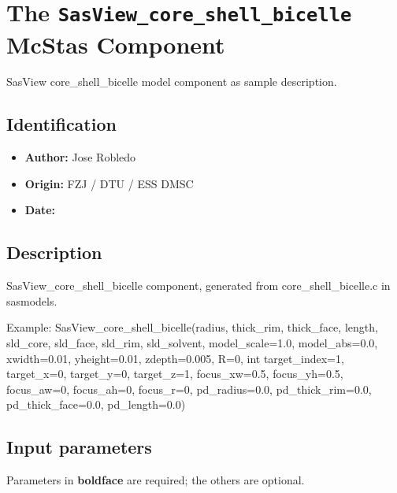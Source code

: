 \section{The \texttt{SasView\_core\_shell\_bicelle} McStas Component}
SasView core\_shell\_bicelle model component as sample description.

\subsection*{Identification}
\begin{itemize}
  \item \textbf{Author:} Jose Robledo
  \item \textbf{Origin:} FZJ / DTU / ESS DMSC
  \item \textbf{Date:} 
\end{itemize}

\subsection*{Description}
SasView\_core\_shell\_bicelle component, generated from core\_shell\_bicelle.c in sasmodels.

Example: SasView\_core\_shell\_bicelle(radius, thick\_rim, thick\_face, length, sld\_core, sld\_face, sld\_rim, sld\_solvent, model\_scale=1.0, model\_abs=0.0, xwidth=0.01, yheight=0.01, zdepth=0.005, R=0, int target\_index=1, target\_x=0, target\_y=0, target\_z=1, focus\_xw=0.5, focus\_yh=0.5, focus\_aw=0, focus\_ah=0, focus\_r=0, pd\_radius=0.0, pd\_thick\_rim=0.0, pd\_thick\_face=0.0, pd\_length=0.0)

\subsection*{Input parameters}
Parameters in \textbf{boldface} are required; the others are optional.

